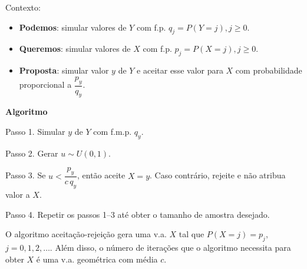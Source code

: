 \documentclass[
  letterpaper,
  DIV=11,
  numbers=noendperiod]{scrreprt}
\providecommand{\tightlist}{%
  \setlength{\itemsep}{0pt}\setlength{\parskip}{0pt}}\usepackage{longtable,booktabs,array}
\begin{document}
Contexto:

\begin{itemize}
\tightlist
\item
  \textbf{Podemos}: simular valores de \(Y\) com f.p.
  \(q_j=P(Y=j), j\geq 0\).
\item
  \textbf{Queremos}: simular valores de \(X\) com f.p.
  \small  \(p_j=P(X=j), j\geq 0\).
\item
  \textbf{Proposta}: simular valor \(y\) de \(Y\) e aceitar esse valor
  para \(X\) com probabilidade proporcional a \(\dfrac{p_y}{q_y}\).
\end{itemize}

\begin{tcolorbox}[enhanced jigsaw, toprule=.15mm, arc=.35mm, colframe=quarto-callout-warning-color-frame, breakable, opacityback=0, rightrule=.15mm, bottomrule=.15mm, left=2mm, leftrule=.75mm, colback=white]

\vspace{-3mm}\textbf{Algoritmo}\vspace{3mm}

Passo 1. Simular \(y\) de \(Y\) com f.m.p. \(q_y\).

Passo 2. Gerar \(u \sim U(0,1)\).

Passo 3. Se \(u < \dfrac{p_y}{c \, q_y}\), então aceite \(X = y\). Caso
contrário, rejeite e não atribua valor a \(X\).

Passo 4. Repetir os passos 1--3 até obter o tamanho de amostra desejado.

\end{tcolorbox}

O algoritmo aceitação-rejeição gera uma v.a. \(X\) tal que
\(P(X=j)=p_j\), \(j=0,1,2,\ldots\). Além disso, o número de iterações
que o algoritmo necessita para obter \(X\) é uma v.a. geométrica com
média \(c\).
\end{document}
